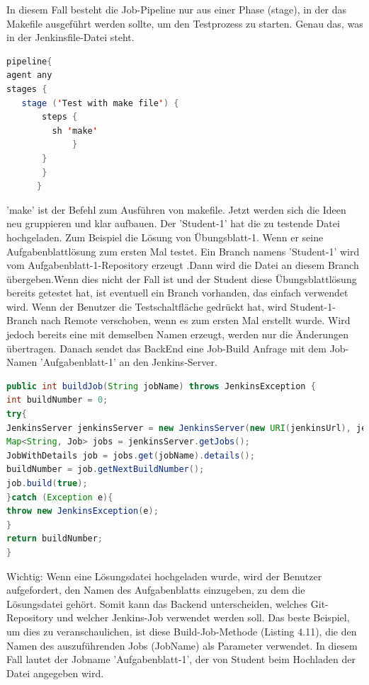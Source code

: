 \documentclass[a4paper,12pt,oneside]{book}
\begin{document}
In diesem Fall besteht die Job-Pipeline nur aus einer Phase (stage), in der das Makefile ausgeführt werden sollte, um den Testprozess zu starten. Genau das, was in der Jenkinsfile-Datei steht.
\begin{lstlisting}[language=JAVA,caption=Jenkinsfile (Job-Pipeline-Skript) ]
pipeline{
agent any
stages {   
   stage ('Test with make file') {
       steps {
         sh 'make'
             }
       }
       }
      }
\end{lstlisting} 
'make' ist der Befehl zum Ausführen von makefile.
\newline
Jetzt werden sich die Ideen neu gruppieren und klar aufbauen. Der 'Student-1' hat die zu testende Datei hochgeladen. Zum Beispiel die Lösung von Übungsblatt-1. Wenn er seine Aufgabenblattlösung zum ersten Mal testet. Ein Branch namens 'Student-1' wird vom Aufgabenblatt-1-Repository erzeugt .Dann wird die Datei an diesem Branch übergeben.Wenn dies nicht der Fall ist und der Student diese Übungsblattlösung bereits getestet hat, ist eventuell ein Branch vorhanden, das einfach verwendet wird. Wenn der Benutzer die Testschaltfläche gedrückt hat, wird Student-1-Branch nach Remote verschoben, wenn es zum ersten Mal erstellt wurde. Wird jedoch bereits eine mit demselben Namen erzeugt, werden nur die Änderungen übertragen. Danach sendet das BackEnd eine Job-Build Anfrage mit dem Job-Namen 'Aufgabenblatt-1' an den Jenkins-Server. 
\begin{lstlisting}[language=JAVA,caption=Job-Build Anfrage ]
	public int buildJob(String jobName) throws JenkinsException {
int buildNumber = 0;
try{
JenkinsServer jenkinsServer = new JenkinsServer(new URI(jenkinsUrl), jenkinsUser, jenkinsPassword);
Map<String, Job> jobs = jenkinsServer.getJobs();
JobWithDetails job = jobs.get(jobName).details();
buildNumber = job.getNextBuildNumber();
job.build(true);
}catch (Exception e){
throw new JenkinsException(e);
}
return buildNumber;
}
\end{lstlisting} 
Wichtig: Wenn eine Lösungsdatei hochgeladen wurde, wird der Benutzer aufgefordert, den Namen des Aufgabenblatts einzugeben, zu dem die Lösungsdatei gehört. Somit kann das Backend unterscheiden, welches Git-Repository und welcher Jenkins-Job verwendet werden soll. Das beste Beispiel, um dies zu veranschaulichen, ist diese Build-Job-Methode (Listing 4.11), die den Namen des auszuführenden Jobs (JobName) als Parameter verwendet. In diesem Fall lautet der Jobname 'Aufgabenblatt-1', der von Student beim Hochladen der Datei angegeben wird.
\newline
\end{document}
